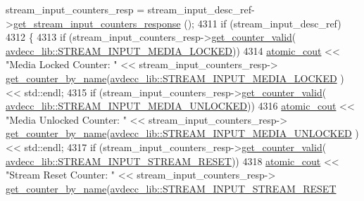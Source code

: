 \begin{DoxyCode}
      stream\_input\_counters\_resp = stream\_input\_desc\_ref->\hyperlink{classavdecc__lib_1_1stream__input__descriptor_a7b540863a150eeb6ba2db06ee16ae0ce}{get\_stream\_input\_counters\_response}
      ();
4311             \textcolor{keywordflow}{if} (stream\_input\_desc\_ref)
4312             \{
4313                 \textcolor{keywordflow}{if} (stream\_input\_counters\_resp->\hyperlink{classavdecc__lib_1_1stream__input__counters__response_a1a714d004a3ca8b521311ba4d3e62e93}{get\_counter\_valid}(
      \hyperlink{namespaceavdecc__lib_a831be56dba8ac423258a9374a1202df4a8ca22955ca085351b236a4b2b75652cf}{avdecc\_lib::STREAM\_INPUT\_MEDIA\_LOCKED}))
4314                     \hyperlink{cmd__line_8h_a0bc38ccc65c79ba06c6fcd7b4bf554c3}{atomic\_cout} << \textcolor{stringliteral}{"Media Locked Counter: "} << stream\_input\_counters\_resp->
      \hyperlink{classavdecc__lib_1_1stream__input__counters__response_aad68050f63fc17c24527b3157d6ca8c7}{get\_counter\_by\_name}(\hyperlink{namespaceavdecc__lib_a831be56dba8ac423258a9374a1202df4a8ca22955ca085351b236a4b2b75652cf}{avdecc\_lib::STREAM\_INPUT\_MEDIA\_LOCKED}
      ) << std::endl;
4315                 \textcolor{keywordflow}{if} (stream\_input\_counters\_resp->\hyperlink{classavdecc__lib_1_1stream__input__counters__response_a1a714d004a3ca8b521311ba4d3e62e93}{get\_counter\_valid}(
      \hyperlink{namespaceavdecc__lib_a831be56dba8ac423258a9374a1202df4aef32d9545c5634d3eae3cdfdb932d14b}{avdecc\_lib::STREAM\_INPUT\_MEDIA\_UNLOCKED}))
4316                     \hyperlink{cmd__line_8h_a0bc38ccc65c79ba06c6fcd7b4bf554c3}{atomic\_cout} << \textcolor{stringliteral}{"Media Unlocked Counter: "} << stream\_input\_counters\_resp->
      \hyperlink{classavdecc__lib_1_1stream__input__counters__response_aad68050f63fc17c24527b3157d6ca8c7}{get\_counter\_by\_name}(\hyperlink{namespaceavdecc__lib_a831be56dba8ac423258a9374a1202df4aef32d9545c5634d3eae3cdfdb932d14b}{avdecc\_lib::STREAM\_INPUT\_MEDIA\_UNLOCKED}
      ) << std::endl;
4317                 \textcolor{keywordflow}{if} (stream\_input\_counters\_resp->\hyperlink{classavdecc__lib_1_1stream__input__counters__response_a1a714d004a3ca8b521311ba4d3e62e93}{get\_counter\_valid}(
      \hyperlink{namespaceavdecc__lib_a831be56dba8ac423258a9374a1202df4adeaebf8560ac1735fdd853442d526fea}{avdecc\_lib::STREAM\_INPUT\_STREAM\_RESET}))
4318                     \hyperlink{cmd__line_8h_a0bc38ccc65c79ba06c6fcd7b4bf554c3}{atomic\_cout} << \textcolor{stringliteral}{"Stream Reset Counter: "} << stream\_input\_counters\_resp->
      \hyperlink{classavdecc__lib_1_1stream__input__counters__response_aad68050f63fc17c24527b3157d6ca8c7}{get\_counter\_by\_name}(\hyperlink{namespaceavdecc__lib_a831be56dba8ac423258a9374a1202df4adeaebf8560ac1735fdd853442d526fea}{avdecc\_lib::STREAM\_INPUT\_STREAM\_RESET}

\end{DoxyCode}
